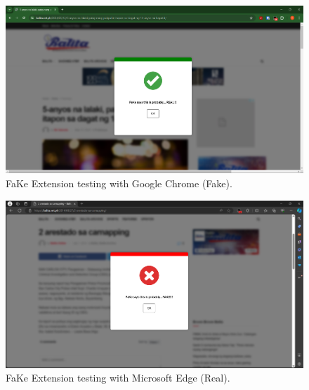         \begin{figure}[h!]
            \centering
            \includegraphics[width=1\textwidth,height=1\textheight, keepaspectratio]{figures/Screenshots/chrome-true-negative.png}
            \caption{FaKe Extension testing with Google Chrome (Fake).}
            \label{fig:fake-chrome-test}
            \end{figure}

        \begin{figure}[h!]
            \centering
            \includegraphics[width=1\textwidth,height=1\textheight, keepaspectratio]{figures/Screenshots/edge-true-positive.png}
            \caption{FaKe Extension testing with Microsoft Edge (Real).}
            \label{fig:real-edge-test}
        \end{figure}

